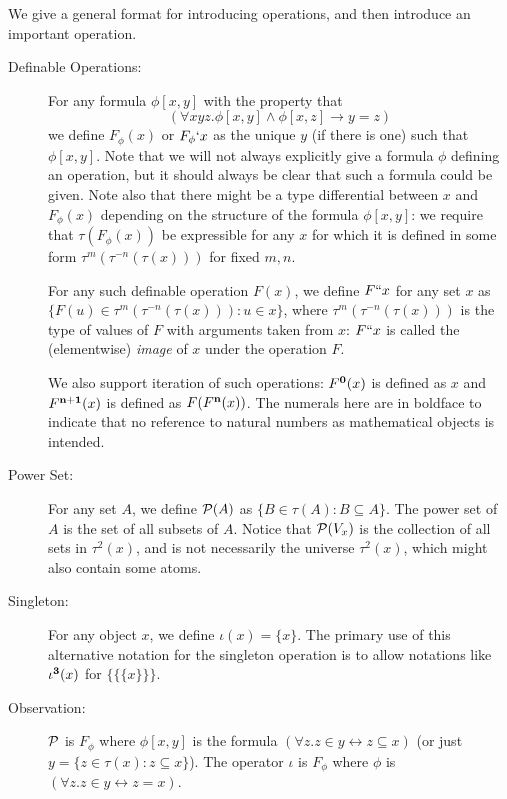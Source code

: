 \documentclass[12pt]{book}
\begin{document}
We give a general format for introducing operations, and then
introduce an important operation.

\begin{description}

\item[Definable Operations:] For any formula $\phi[x,y]$ with the
property that $$(\forall xyz.\phi[x,y] \wedge \phi[x,z] \rightarrow
y=z)$$ we define $F_{\phi}(x)$ or $F_{\phi}`x$ as the unique $y$ (if
there is one) such that $\phi[x,y]$.  Note that we will not always
explicitly give a formula $\phi$ defining an operation, but it should
always be clear that such a formula could be given.  Note also that
there might be a type differential between $x$ and $F_{\phi}(x)$
depending on the structure of the formula $\phi[x,y]$:  we require that
$\tau(F_\phi(x))$ be expressible for any $x$ for which it is defined
in some form $\tau^m(\tau^{-n}(\tau(x)))$ for fixed $m,n$.

For any such definable operation $F(x)$, we define $F``x$ for any set
$x$ as $\{F(u) \in \tau^m(\tau^{-n}(\tau(x))):  u \in x\}$, where $\tau^m(\tau^{-n}(\tau(x)))$ is the type of values of $F$ with arguments taken from $x$: $F``x$ is called the (elementwise) {\em
image\/} of $x$ under the operation $F$.

We also support iteration of such operations:  $F^{\bf 0}(x)$ is defined as
$x$ and $F^{\bf n+1}(x)$ is defined as $F(F^{\bf n}(x))$.   The numerals here are in boldface to indicate that no reference to natural numbers as mathematical objects is intended.

\item[Power Set:] For any set $A$, we define ${\cal P}(A)$ as $\{B
\in \tau(A): B \subseteq A\}$.  The power set of $A$ is the set of all subsets
of $A$.  Notice that ${\cal P}(V_x)$ is the collection of all
sets in $\tau^2(x)$, and is not necessarily the universe $\tau^2(x)$,
which might also contain some atoms.

\item[Singleton:]  For any object $x$, we define $\iota(x)=\{x\}$.  The primary use
of this alternative notation for the singleton operation is to allow notations like $\iota^{\bf 3}(x)$ for $\{\{\{x\}\}\}$.

\item[Observation:] $\cal P$ is $F_{\phi}$ where $\phi[x,y]$ is the
formula $(\forall z.z \in y \leftrightarrow z \subseteq x)$ (or just $y = \{z \in \tau(x):  z \subseteq x\}$).  The operator $\iota$ is $F_{\phi}$ where $\phi$ is $(\forall z.z \in y \leftrightarrow z=x)$.

\end{description}
\end{document}
